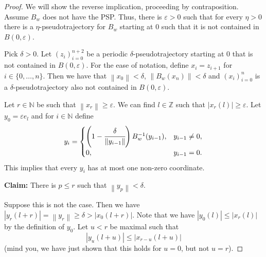 \documentclass[11pt,a4paper]{amsart}
\theoremstyle{definition}
\newcommand{\Z}{\mathbb{Z}}
\newcommand{\N}{\mathbb{N}}
\newcommand{\eps}{\varepsilon}
\newcommand{\abs}[1]{\left| #1 \right|}
\newcommand{\norm}[1]{\left\| #1 \right\|}
\begin{document}
	\begin{proof}
		We will show the reverse implication, proceeding by contraposition. Assume \(B_w\) does not have the PSP. Thus, there is \(\varepsilon > 0\) such that for every \(\eta > 0\) there is a \(\eta\)-pseudotrajectory for \(B_w\) starting at \(0\) such that it is not contained in \(B(0,\varepsilon)\).
		
		Pick \(\delta > 0\). Let \((z_i)_{i=0}^{n+2}\) be a periodic \(\delta\)-pseudotrajectory starting at \(0\) that is not contained in \(B(0,\varepsilon)\). For the ease of notation, define \(x_i = z_{i+1}\) for \(i \in \{0, \dots,n\}\). Then we have that \(\norm{x_0} < \delta \), \(\norm{B_w(x_{n})} < \delta \) and \((x_i)_{i=0}^{n}\) is a \(\delta\)-pseudotrajectory also not contained in \(B(0, \varepsilon)\). 
		
		Let \(r \in \N\) be such that \(\norm{x_r} \geq \varepsilon\). We can find \(l \in \Z\) such that \(\abs{x_r(l)} \geq \varepsilon\). Let \(y_0 = \eps e_l \) and for \(i \in \N\) define
		\begin{equation} \label{eqn:renormedErrorDef}
			y_{i}= \begin{cases}
				\left(1-\cfrac{\delta}{\norm{y_{i-1}}}\right)B_w^{-1}(y_{i-1}), & y_{i-1} \neq 0,\\
				0, & y_{i-1} = 0.
			\end{cases}
		\end{equation}
		This implies that every \(y_i\) has at most one non-zero coordinate.
		
		\textbf{Claim:} There is \(p \leq r\) such that \(\norm{y_p} < \delta\).
		
		Suppose this is not the case. Then we have \(\abs{y_r(l+r)} = \norm{y_r} \geq \delta > \abs{x_{0}(l+r)}\). Note that we have \(\abs{y_0(l)} \leq \abs{x_{r}(l)}\) by the definition of \(y_0\). Let \(u < r\) be maximal such that
		\begin{equation}\label{eqn:maximalu}
			\abs{y_u(l+u)} \leq \abs{x_{r-u}(l+u)}  
		\end{equation}
		(mind you, we have just shown that this holds for $u = 0$, but not $u=r$).
		

\end{proof}
\end{document}
